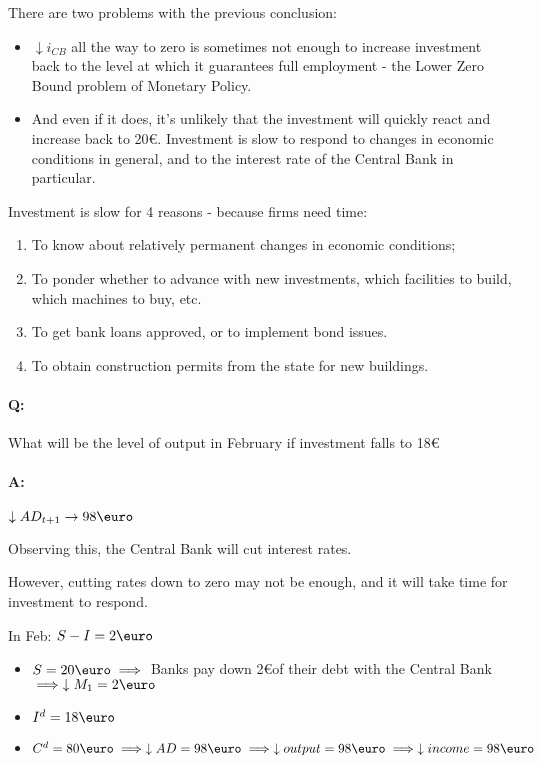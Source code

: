 \documentclass{report}
\begin{document}
There are two problems with the previous conclusion: 
\begin{itemize}
    \item $\downarrow i_{CB}$ all the way to zero is sometimes not enough to increase investment back to the level at which it guarantees full employment - the Lower Zero Bound problem of Monetary Policy. 
    \item And even if it does, it's unlikely that the investment will quickly react and increase back to 20\euro. Investment is slow to respond to changes in economic conditions in general, and to the interest rate of the Central Bank in particular. 
\end{itemize}

Investment is slow for 4 reasons - because firms need time:
\begin{enumerate}
    \item To know about relatively permanent changes in economic conditions; 
    \item To ponder whether to advance with new investments, which facilities to build, which machines to buy, etc. 
    \item To get bank loans approved, or to implement bond issues.
    \item To obtain construction permits from the state for new buildings. 
\end{enumerate}


\paragraph{Q:} What will be the level of output in February if investment falls to 18\euro
\paragraph{A:} $\downarrow AD_{t+1} \rightarrow 98\text{\euro}$ 

Observing this, the Central Bank will cut interest rates. 

However, cutting rates down to zero may not be enough, and it will take time for investment to respond. 

In Feb: $S-I=2\text{\euro}$
\begin{itemize}
    \item $S=20\text{\euro} \implies$ Banks pay down 2\euro of their debt with the Central Bank $\implies \downarrow M_1=2\text{\euro}$
    \item $I^d=18\text{\euro}$
    \item $C^d=80\text{\euro} \implies \downarrow AD=98\text{\euro} \implies \downarrow output=98\text{\euro}\implies \downarrow income=98\text{\euro}$
\end{itemize}
\end{document}

